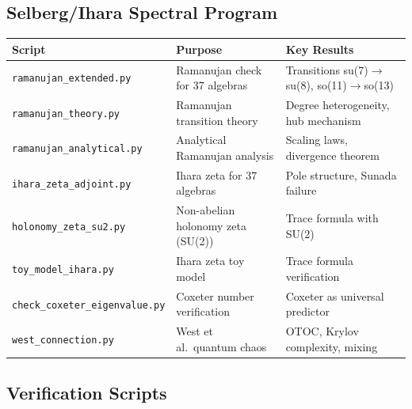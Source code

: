 \subsection{Selberg/Ihara Spectral Program}\label{app:spectral_code}

\begin{center}
\small
{}
\label{tab:spectral_scripts}
\begin{tabular}{lll}
\hline\hline
Script & Purpose & Key Results \\
\hline
\texttt{ramanujan\_extended.py} & Ramanujan check for 37 algebras & Transitions su(7)$\to$su(8), so(11)$\to$so(13) \\
\texttt{ramanujan\_theory.py} & Ramanujan transition theory & Degree heterogeneity, hub mechanism \\
\texttt{ramanujan\_analytical.py} & Analytical Ramanujan analysis & Scaling laws, divergence theorem \\
\texttt{ihara\_zeta\_adjoint.py} & Ihara zeta for 37 algebras & Pole structure, Sunada failure \\
\texttt{holonomy\_zeta\_su2.py} & Non-abelian holonomy zeta (SU(2)) & Trace formula with SU(2) \\
\texttt{toy\_model\_ihara.py} & Ihara zeta toy model & Trace formula verification \\
\texttt{check\_coxeter\_eigenvalue.py} & Coxeter number verification & Coxeter as universal predictor \\
\texttt{west\_connection.py} & West et al.\ quantum chaos & OTOC, Krylov complexity, mixing \\
\hline\hline
\end{tabular}
\end{center}

\subsection{Verification Scripts}\label{app:verification_code}

